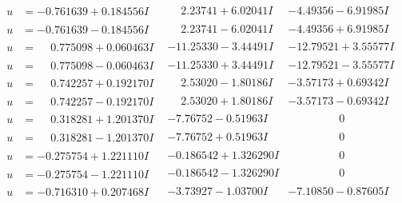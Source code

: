 \documentclass[1p]{elsarticle_modified}
\theoremstyle{definition}
\begin{document}
$$\begin{array}{c|c|c}
\begin{aligned}
u &= -0.761639 + 0.184556 I\end{aligned}
 & \phantom{-}2.23741 + 6.02041 I & -4.49356 - 6.91985 I \\ \hline\begin{aligned}
u &= -0.761639 - 0.184556 I\end{aligned}
 & \phantom{-}2.23741 - 6.02041 I & -4.49356 + 6.91985 I \\ \hline\begin{aligned}
u &= \phantom{-}0.775098 + 0.060463 I\end{aligned}
 & -11.25330 - 3.44491 I & -12.79521 + 3.55577 I \\ \hline\begin{aligned}
u &= \phantom{-}0.775098 - 0.060463 I\end{aligned}
 & -11.25330 + 3.44491 I & -12.79521 - 3.55577 I \\ \hline\begin{aligned}
u &= \phantom{-}0.742257 + 0.192170 I\end{aligned}
 & \phantom{-}2.53020 - 1.80186 I & -3.57173 + 0.69342 I \\ \hline\begin{aligned}
u &= \phantom{-}0.742257 - 0.192170 I\end{aligned}
 & \phantom{-}2.53020 + 1.80186 I & -3.57173 - 0.69342 I \\ \hline\begin{aligned}
u &= \phantom{-}0.318281 + 1.201370 I\end{aligned}
 & -7.76752 - 0.51963 I & \phantom{-0.000000 } 0 \\ \hline\begin{aligned}
u &= \phantom{-}0.318281 - 1.201370 I\end{aligned}
 & -7.76752 + 0.51963 I & \phantom{-0.000000 } 0 \\ \hline\begin{aligned}
u &= -0.275754 + 1.221110 I\end{aligned}
 & -0.186542 + 1.326290 I & \phantom{-0.000000 } 0 \\ \hline\begin{aligned}
u &= -0.275754 - 1.221110 I\end{aligned}
 & -0.186542 - 1.326290 I & \phantom{-0.000000 } 0 \\ \hline\begin{aligned}
u &= -0.716310 + 0.207468 I\end{aligned}
 & -3.73927 - 1.03700 I & -7.10850 - 0.87605 I \\ \hline\begin{aligned}

\end{aligned}
\end{array}$$
\end{document}
